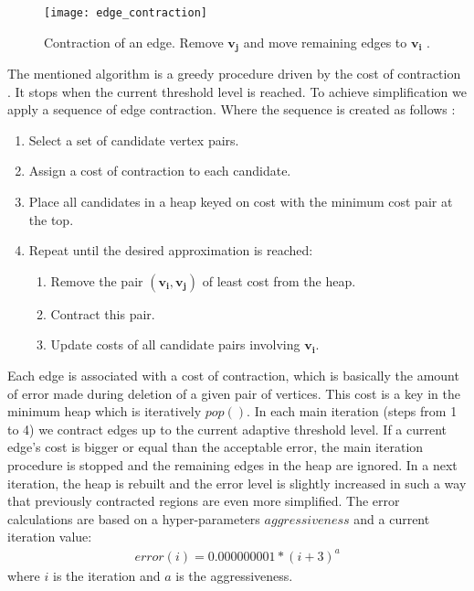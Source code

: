 \begin{figure}[h!]
  \begin{center}
    \texttt{[image: edge\_contraction]}
    \caption{Contraction of an edge. Remove $\mathbf{v_j}$ and move remaining edges to $\mathbf{v_i}$ \cite{garland99}.}
    \label{fig:edge_contraction_ref}
  \end{center}
\end{figure}

The mentioned algorithm is a greedy procedure driven by the cost of contraction \cite{cormen01}. It stops when the current threshold level is reached. To achieve simplification we apply a sequence of edge contraction. Where the sequence is created as follows \cite{garland97}:

\begin{enumerate}
\item Select a set of candidate vertex pairs.
\item Assign a cost of contraction to each candidate.
\item Place all candidates in a heap keyed on cost with the minimum cost pair at the top.
\item Repeat until the desired approximation is reached:
\begin{enumerate}
\item Remove the pair $(\mathbf{v_i}, \mathbf{v_j})$ of least cost from the heap.
\item Contract this pair.
\item Update costs of all candidate pairs involving $\mathbf{v_i}$.
\end{enumerate}
\end{enumerate}

Each edge is associated with a cost of contraction, which is basically the amount of error made during deletion of a given pair of vertices. This cost is a key in the minimum heap \cite{cormen01} which is iteratively $pop()$. In each main iteration (steps from 1 to 4) we contract edges up to the current adaptive threshold level. If a current edge's cost is bigger or equal than the acceptable error, the main iteration procedure is stopped and the remaining edges in the heap are ignored. In a next iteration, the heap is rebuilt and the error level is slightly increased in such a way that previously contracted regions are even more simplified. The error calculations are based on a hyper-parameters $aggressiveness$ and a current iteration value:
\begin{align}
error(i)=0.000000001*(i+3)^a
\label{error_formula}
\end{align}
where $i$ is the iteration and $a$ is the aggressiveness.

